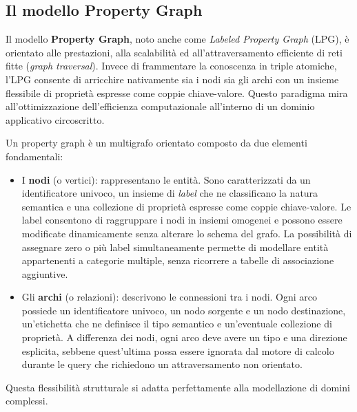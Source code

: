 \subsection{Il modello Property Graph}
Il modello \textbf{Property Graph}, noto anche come \textit{Labeled Property Graph} (LPG),  è orientato alle prestazioni, alla scalabilità ed all'attraversamento efficiente di reti fitte (\textit{graph traversal}). Invece di frammentare la conoscenza in triple atomiche, l'LPG consente di arricchire nativamente sia i nodi sia gli archi con un insieme flessibile di proprietà espresse come coppie chiave-valore. Questo paradigma mira  all'ottimizzazione dell'efficienza computazionale all'interno di un dominio applicativo circoscritto. 

Un property graph è un multigrafo orientato composto da due elementi fondamentali:
\begin{itemize}
    \item I \textbf{nodi} (o vertici): rappresentano le entità. Sono caratterizzati da un identificatore univoco, un insieme di \textit{label} che ne classificano la natura semantica e una collezione di proprietà espresse come coppie chiave-valore. Le label consentono di raggruppare i nodi in insiemi omogenei e possono essere modificate dinamicamente senza alterare lo schema del grafo. La possibilità di assegnare zero o più label simultaneamente permette di modellare entità appartenenti a categorie multiple, senza ricorrere a tabelle di associazione aggiuntive.
    \item Gli \textbf{archi} (o relazioni): descrivono le connessioni tra i nodi. Ogni arco possiede un identificatore univoco, un nodo sorgente e un nodo destinazione, un'etichetta che ne definisce il tipo semantico e un'eventuale collezione di proprietà. A differenza dei nodi, ogni arco deve avere un tipo e una direzione esplicita, sebbene quest'ultima possa essere ignorata dal motore di calcolo durante le query che richiedono un attraversamento non orientato.
\end{itemize}

Questa flessibilità strutturale si adatta perfettamente alla modellazione di domini complessi.

